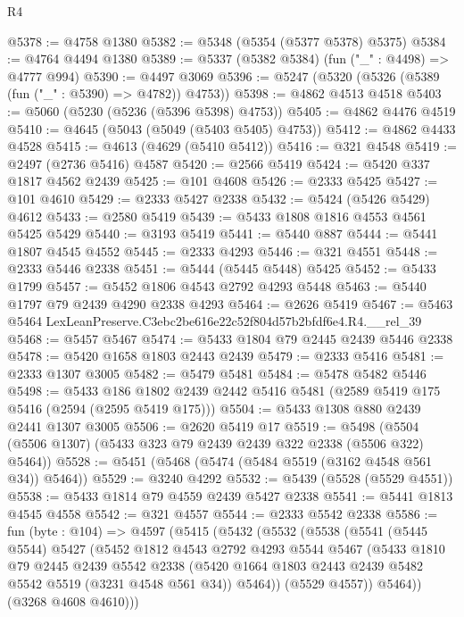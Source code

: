 \begin{lexlean}{R4}
\begin{coremodule}
@5378 := @4758 @1380
@5382 := @5348 (@5354 (@5377 @5378) @5375)
@5384 := @4764 @4494 @1380
@5389 := @5337 (@5382 @5384) (fun ("_" : @4498) => @4777 @994)
@5390 := @4497 @3069
@5396 := @5247 (@5320 (@5326 (@5389 (fun ("_" : @5390) => @4782)) @4753))
@5398 := @4862 @4513 @4518
@5403 := @5060 (@5230 (@5236 (@5396 @5398) @4753))
@5405 := @4862 @4476 @4519
@5410 := @4645 (@5043 (@5049 (@5403 @5405) @4753))
@5412 := @4862 @4433 @4528
@5415 := @4613 (@4629 (@5410 @5412))
@5416 := @321 @4548
@5419 := @2497 (@2736 @5416) @4587
@5420 := @2566 @5419
@5424 := @5420 @337 @1817 @4562 @2439
@5425 := @101 @4608
@5426 := @2333 @5425
@5427 := @101 @4610
@5429 := @2333 @5427 @2338
@5432 := @5424 (@5426 @5429) @4612
@5433 := @2580 @5419
@5439 := @5433 @1808 @1816 @4553 @4561 @5425 @5429
@5440 := @3193 @5419
@5441 := @5440 @887
@5444 := @5441 @1807 @4545 @4552
@5445 := @2333 @4293
@5446 := @321 @4551
@5448 := @2333 @5446 @2338
@5451 := @5444 (@5445 @5448) @5425
@5452 := @5433 @1799
@5457 := @5452 @1806 @4543 @2792 @4293 @5448
@5463 := @5440 @1797 @79 @2439 @4290 @2338 @4293
@5464 := @2626 @5419
@5467 := @5463 @5464 LexLeanPreserve.C3ebc2be616e22c52f804d57b2bfdf6e4.R4.__rel_39
@5468 := @5457 @5467
@5474 := @5433 @1804 @79 @2445 @2439 @5446 @2338
@5478 := @5420 @1658 @1803 @2443 @2439
@5479 := @2333 @5416
@5481 := @2333 @1307 @3005
@5482 := @5479 @5481
@5484 := @5478 @5482 @5446
@5498 := @5433
    @186
    @1802
    @2439
    @2442
    @5416
    @5481
    (@2589 @5419 @175 @5416 (@2594 (@2595 @5419 @175)))
@5504 := @5433 @1308 @880 @2439 @2441 @1307 @3005
@5506 := @2620 @5419 @17
@5519 := @5498 (@5504 (@5506 @1307) (@5433 @323 @79 @2439 @2439 @322 @2338 (@5506 @322) @5464))
@5528 := @5451 (@5468 (@5474 (@5484 @5519 (@3162 @4548 @561 @34)) @5464))
@5529 := @3240 @4292
@5532 := @5439 (@5528 (@5529 @4551))
@5538 := @5433 @1814 @79 @4559 @2439 @5427 @2338
@5541 := @5441 @1813 @4545 @4558
@5542 := @321 @4557
@5544 := @2333 @5542 @2338
@5586 := fun (byte : @104) =>
  @4597
    (@5415
      (@5432
        (@5532
          (@5538
            (@5541
              (@5445 @5544)
              @5427
              (@5452
                @1812
                @4543
                @2792
                @4293
                @5544
                @5467
                (@5433
                  @1810
                  @79
                  @2445
                  @2439
                  @5542
                  @2338
                  (@5420 @1664 @1803 @2443 @2439 @5482 @5542 @5519 (@3231 @4548 @561 @34))
                  @5464))
              (@5529 @4557))
            @5464))
        (@3268 @4608 @4610)))

\end{coremodule}
\end{lexlean}

